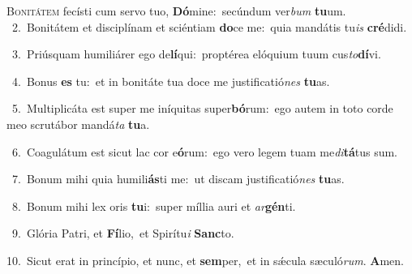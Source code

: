 \lettrine{\initial\textcolor{\initialcolor}{B}}{onitátem} fecísti cum servo tuo, \textbf{Dó}\-mine:~\star secúndum ver\textit{bum} \textbf{tu}\-um.\\
{\numbfont\textcolor{\numbcolor}{~2.}}~Bonitátem et disciplínam et sciéntiam \textbf{do}\-ce me:~\star quia mandátis tu\textit{is} \textbf{cré}\-didi.\par
{\numbfont\textcolor{\numbcolor}{~3.}}~Priúsquam humiliárer ego de\-\textbf{lí}\-qui:~\star proptérea elóquium tuum cus\-\textit{to}\-\textbf{dí}vi.\par
{\numbfont\textcolor{\numbcolor}{~4.}}~Bonus \textbf{es} tu:~\star et in bonitáte tua doce me justificatió\textit{nes} \textbf{tu}\-as.\par
{\numbfont\textcolor{\numbcolor}{~5.}}~Multiplicáta est super me iníquitas super\-\textbf{bó}\-rum:~\star ego autem in toto corde meo scrutábor mandá\textit{ta} \textbf{tu}\-a.\par
{\numbfont\textcolor{\numbcolor}{~6.}}~Coagulátum est sicut lac cor e\-\textbf{ó}\-rum:~\star ego vero legem tuam me\-\textit{di}\-\textbf{tá}tus sum.\par
{\numbfont\textcolor{\numbcolor}{~7.}}~Bonum mihi quia humili\-\textbf{ás}\-ti me:~\star ut discam justificatió\textit{nes} \textbf{tu}\-as.\par
{\numbfont\textcolor{\numbcolor}{~8.}}~Bonum mihi lex oris \textbf{tu}\-i:~\star super míllia auri et \textit{ar}\-\textbf{gén}ti.\par
{\numbfont\textcolor{\numbcolor}{~9.}}~Glória Patri, et \textbf{Fí}\-lio,~\star et Spirítu\textit{i} \textbf{Sanc}\-to.\par
{\numbfont\textcolor{\numbcolor}{10.}}~Sicut erat in princípio, et nunc, et \textbf{sem}\-per,~\star et in sǽcula sæculó\-\textit{rum}\-. \textbf{A}\-men.\par
